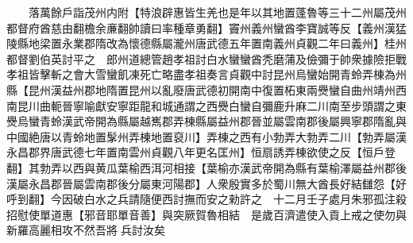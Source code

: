 　　落萬餘戶詣茂州内附【特浪辟惠皆生羌也是年以其地置蓬魯等三十二州屬茂州都督府酋慈由翻檐余亷翻帥讀曰率種章勇翻】竇州義州蠻酋李寶誠等反【義州漢猛陵縣地梁置永業郡隋改為懷德縣屬瀧州唐武德五年置南義州貞觀二年曰義州】桂州都督劉伯英討平之　郎州道總管趙孝祖討白水蠻蠻酋秃磨蒲及儉彌于帥衆據險拒戰孝祖皆擊斬之會大雪蠻飢凍死亡略盡孝祖奏言貞觀中討昆州烏蠻始開青蛉弄棟為州縣【昆州漢益州郡地隋置昆州以亂廢唐武德初開南中復置柘東兩㸑蠻自曲州靖州西南昆川曲軛晉寧喻獻安寧距龍和城通謂之西㸑白蠻自彌鹿升麻二川南至步頭謂之東㸑烏蠻青蛉漢武帝開為縣屬越嶲郡弄棟縣屬益州郡晉並屬雲南郡後屬興寧郡隋亂與中國絶唐以青蛉地置髳州弄棟地置裒川】弄棟之西有小勃弄大勃弄二川【勃弄屬漢永昌郡界唐武德七年置南雲州貞觀八年更名匡州】恒扇誘弄棟欲使之反【恒戶登翻】其勃弄以西與黄瓜葉榆西洱河相接【葉榆亦漢武帝開為縣有葉榆澤屬益州郡後漢屬永昌郡晉屬雲南郡後分屬東河陽郡】人衆殷實多於蜀川無大酋長好結讎怨【好呼到翻】今因破白水之兵請隨便西討撫而安之勑許之　十二月壬子處月朱邪孤注殺招慰使單道惠【邪音耶單音善】與突厥賀魯相結　是歲百濟遣使入貢上戒之使勿與新羅高麗相攻不然吾將兵討汝矣

